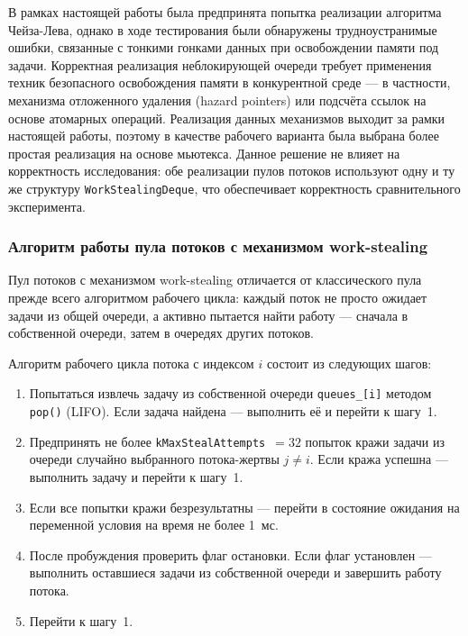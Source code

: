В рамках настоящей работы была предпринята попытка реализации
алгоритма Чейза-Лева, однако в ходе тестирования были обнаружены
трудноустранимые ошибки, связанные с тонкими гонками данных при
освобождении памяти под задачи. Корректная реализация
неблокирующей очереди требует применения техник безопасного
освобождения памяти в конкурентной среде --- в частности,
механизма отложенного удаления (hazard pointers) или подсчёта
ссылок на основе атомарных операций. Реализация данных механизмов
выходит за рамки настоящей работы, поэтому в качестве рабочего
варианта была выбрана более простая реализация на основе мьютекса.
Данное решение не влияет на корректность исследования: обе
реализации пулов потоков используют одну и ту же структуру
\texttt{WorkStealingDeque}, что обеспечивает корректность
сравнительного эксперимента.

\subsubsection{Алгоритм работы пула потоков с механизмом
work-stealing}

Пул потоков с механизмом work-stealing отличается от классического
пула прежде всего алгоритмом рабочего цикла: каждый поток не
просто ожидает задачи из общей очереди, а активно пытается найти
работу --- сначала в собственной очереди, затем в очередях других
потоков.

Алгоритм рабочего цикла потока с индексом $i$ состоит
из следующих шагов:

\begin{enumerate}
    \item Попытаться извлечь задачу из собственной очереди
          \texttt{queues\_[i]} методом \texttt{pop()} (LIFO).
          Если задача найдена --- выполнить её и перейти к шагу~1.
    \item Предпринять не более \texttt{kMaxStealAttempts}~$= 32$
          попыток кражи задачи из очереди случайно выбранного
          потока-жертвы $j \neq i$.
          Если кража успешна --- выполнить задачу и перейти
          к шагу~1.
    \item Если все попытки кражи безрезультатны --- перейти
          в состояние ожидания на переменной условия
          на время не более 1~мс.
    \item После пробуждения проверить флаг остановки.
          Если флаг установлен --- выполнить оставшиеся задачи
          из собственной очереди и завершить работу потока.
    \item Перейти к шагу~1.
\end{enumerate}

